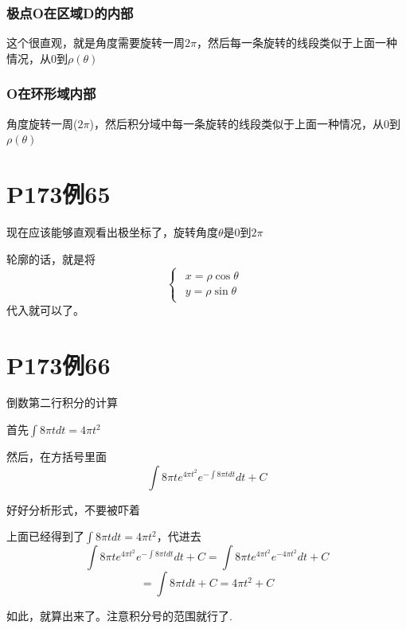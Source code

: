 \documentclass[a4paper]{ctexart}
\begin{document}
\begin{multicols}{2}
\subsubsection{极点O在区域D的内部}
\par 这个很直观，就是角度需要旋转一周$2\pi$，然后每一条旋转的线段类似于上面一种情况，从0到$\rho(\theta)$

\subsubsection{O在环形域内部}
\par 角度旋转一周($2\pi$)，然后积分域中每一条旋转的线段类似于上面一种情况，从0到$\rho(\theta)$

\section{P173例65}
\par 现在应该能够直观看出极坐标了，旋转角度$\theta$是0到$2\pi$
\par 轮廓的话，就是将
\begin{equation}
\begin{cases}
\begin{array}{l}    
x = \rho \cos{\theta} \\
y = \rho \sin{\theta}
\end{array}    
\end{cases}
\end{equation}
代入就可以了。

\section{P173例66}
\par 倒数第二行积分的计算
\par 首先$\int{8\pi tdt} = 4\pi t^2$
\par 然后，在方括号里面
\begin{equation}
\int{8\pi t e^{4\pi t^2} e^{-\int{8\pi tdt}}dt} + C
\end{equation}
\par 好好分析形式，不要被吓着
\par 上面已经得到了$\int{8\pi tdt} = 4\pi t^2$，代进去
\begin{equation}
\int{8\pi t e^{4\pi t^2} e^{-\int{8\pi tdt}}dt + C}
= \int{8\pi t e^{4\pi t^2} e^{-4\pi t^2}dt + C}
\end{equation}
\begin{equation}
=
\int{8\pi tdt + C}
= 4\pi t^2 + C
\end{equation}
\par 如此，就算出来了。注意积分号的范围就行了.


\end{multicols}
\end{document}
